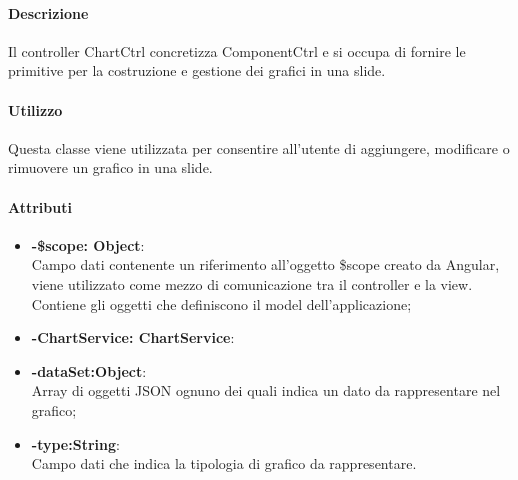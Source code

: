    \paragraph{Descrizione}
	Il controller ChartCtrl concretizza ComponentCtrl e si occupa di fornire le primitive per la costruzione e gestione dei grafici in una slide.
		
	\paragraph{Utilizzo}
	Questa classe viene utilizzata per consentire all'utente di aggiungere, modificare o rimuovere un grafico in una slide.
	
	\paragraph{Attributi}
	\begin{itemize}
		\item \textbf{-\$scope: Object}:\\
			Campo dati contenente un riferimento all'oggetto \$scope creato da Angular, viene utilizzato come mezzo di comunicazione tra il controller e la view. Contiene gli oggetti che definiscono il model dell'applicazione;
		\item \textbf{-ChartService: ChartService}:\\
		\item\textbf{-dataSet:Object}:\\
			Array di oggetti JSON ognuno dei quali indica un dato da rappresentare nel grafico;
		\item\textbf{-type:String}:\\
			Campo dati che indica la tipologia di grafico da rappresentare.
	\end{itemize}
	
